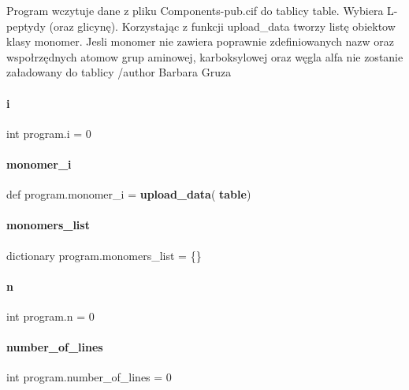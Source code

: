 Program wczytuje dane z pliku Components-\/pub.\+cif do tablicy \textquotesingle{}table\textquotesingle{}. Wybiera L-\/peptydy (oraz glicynę). Korzystając z funkcji \textquotesingle{}upload\+\_\+data\textquotesingle{} tworzy listę obiektow klasy monomer. Jesli monomer nie zawiera poprawnie zdefiniowanych nazw oraz wspołrzędnych atomow grup aminowej, karboksylowej oraz węgla alfa nie zostanie załadowany do tablicy /author Barbara Gruza \mbox{\label{namespaceprogram_ac317d4ad54c6a8161f773f78ed3706df}} 
\paragraph{i}
{\footnotesize\ttfamily int program.\+i = 0}

\mbox{\label{namespaceprogram_a282e8ffbb5b2791e00ca1d1923c4f889}} 
\paragraph{monomer\+\_\+i}
{\footnotesize\ttfamily def program.\+monomer\+\_\+i = \textbf{ upload\+\_\+data}(\textbf{ table})}

\mbox{\label{namespaceprogram_a5e61cf96fe09fa76b9a539537c55cfea}} 
\paragraph{monomers\+\_\+list}
{\footnotesize\ttfamily dictionary program.\+monomers\+\_\+list = \{\}}

\mbox{\label{namespaceprogram_abf45047966c69469c1b1ae16dddfd97f}} 
\paragraph{n}
{\footnotesize\ttfamily int program.\+n = 0}

\mbox{\label{namespaceprogram_ae6036ca9fde833c1c16f8f29f393b794}} 
\paragraph{number\+\_\+of\+\_\+lines}
{\footnotesize\ttfamily int program.\+number\+\_\+of\+\_\+lines = 0}

